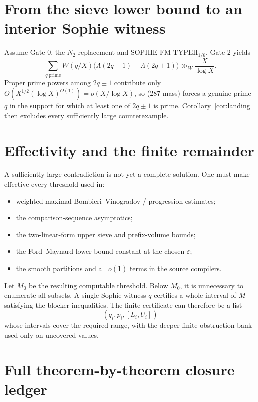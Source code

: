 \documentclass[11pt]{article}
\theoremstyle{definition}
\theoremstyle{remark}
\newcommand{\SophieTI}{\mathrm{SOPHIE\mbox{-}FM\mbox{-}TYPEII}_{1/6}}
\newcommand{\1}{\mathbf 1}
\begin{document}
\section{From the sieve lower bound to an interior Sophie witness}

Assume Gate 0, the $N_2$ replacement and $\SophieTI$.  Gate 2 yields
\[
 \sum_{q\ \mathrm{prime}}W(q/X)
 \bigl(\Lambda(2q-1)+\Lambda(2q+1)\bigr)
 \gg_W\frac X{\log X}.
\tag{287-mass}
\]
Proper prime powers among $2q\pm1$ contribute only
$O(X^{1/2}(\log X)^{O(1)})=o(X/\log X)$, so (287-mass) forces a genuine prime $q$ in the support for which at
least one of $2q\pm1$ is prime.  Corollary~\ref{cor:landing} then excludes every sufficiently large counterexample.

\section{Effectivity and the finite remainder}

A sufficiently-large contradiction is not yet a complete solution.  One must make effective every threshold
used in:
\begin{itemize}
\item weighted maximal Bombieri--Vinogradov / progression estimates;
\item the comparison-sequence asymptotics;
\item the two-linear-form upper sieve and prefix-volume bounds;
\item the Ford--Maynard lower-bound constant at the chosen $\varepsilon$;
\item the smooth partitions and all $o(1)$ terms in the source compilers.
\end{itemize}
Let $M_0$ be the resulting computable threshold.  Below $M_0$, it is unnecessary to enumerate all subsets.
A single Sophie witness $q$ certifies a whole interval of $M$ satisfying the blocker inequalities.  The finite
certificate can therefore be a list
\[
 (q_i,p_i,[L_i,U_i])
\]
whose intervals cover the required range, with the deeper finite obstruction bank used only on uncovered values.

\section{Full theorem-by-theorem closure ledger}
\end{document}
